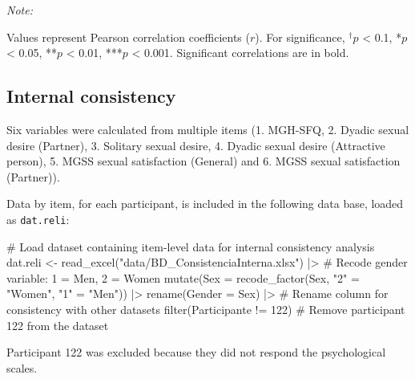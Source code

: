 \documentclass[
  bookmarksnumbered]{article}
\newenvironment{Shaded}{\begin{snugshade}}{\end{snugshade}}
\newcommand{\AttributeTok}[1]{\textcolor[rgb]{0.80,0.80,0.80}{#1}}
\newcommand{\CommentTok}[1]{\textcolor[rgb]{0.50,0.62,0.50}{#1}}
\newcommand{\DecValTok}[1]{\textcolor[rgb]{0.86,0.86,0.80}{#1}}
\newcommand{\FunctionTok}[1]{\textcolor[rgb]{0.94,0.94,0.56}{#1}}
\newcommand{\NormalTok}[1]{\textcolor[rgb]{0.80,0.80,0.80}{#1}}
\newcommand{\OtherTok}[1]{\textcolor[rgb]{0.94,0.94,0.56}{#1}}
\newcommand{\SpecialCharTok}[1]{\textcolor[rgb]{0.86,0.64,0.64}{#1}}
\newcommand{\StringTok}[1]{\textcolor[rgb]{0.80,0.58,0.58}{#1}}
\begin{document}
\begin{landscape}
\begin{table}[H]
{\begin{threeparttable}
\begin{tabular}[t]
\bottomrule
\end{tabular}
\begin{tablenotes}[para]
\item \textit{Note: } 
\item Values represent Pearson correlation coefficients ($r$). For significance, $^{\dagger}p$ < 0.1, *$p$ < 0.05, **$p$ < 0.01, ***$p$ < 0.001. Significant correlations are in bold.
\end{tablenotes}
\end{threeparttable}}
\end{table}
\end{landscape}

\subsection{Internal consistency}\label{internal-consistency}

Six variables were calculated from multiple items (1. MGH-SFQ, 2. Dyadic sexual desire (Partner), 3. Solitary sexual desire, 4. Dyadic sexual desire (Attractive person), 5. MGSS sexual satisfaction (General) and 6. MGSS sexual satisfaction (Partner)).

Data by item, for each participant, is included in the following data base, loaded as \texttt{dat.reli}:

\begin{Shaded}
\begin{Highlighting}[]
\CommentTok{\# Load dataset containing item{-}level data for internal consistency analysis}
\NormalTok{dat.reli }\OtherTok{\textless{}{-}} \FunctionTok{read\_excel}\NormalTok{(}\StringTok{"data/BD\_ConsistenciaInterna.xlsx"}\NormalTok{) }\SpecialCharTok{|\textgreater{}}
  \CommentTok{\# Recode gender variable: 1 = Men, 2 = Women}
  \FunctionTok{mutate}\NormalTok{(}\AttributeTok{Sex =} \FunctionTok{recode\_factor}\NormalTok{(Sex, }\StringTok{"2"} \OtherTok{=} \StringTok{"Women"}\NormalTok{, }\StringTok{"1"} \OtherTok{=} \StringTok{"Men"}\NormalTok{)) }\SpecialCharTok{|\textgreater{}}
  \FunctionTok{rename}\NormalTok{(}\AttributeTok{Gender =}\NormalTok{ Sex) }\SpecialCharTok{|\textgreater{}} \CommentTok{\# Rename column for consistency with other datasets}
  \FunctionTok{filter}\NormalTok{(Participante }\SpecialCharTok{!=} \DecValTok{122}\NormalTok{) }\CommentTok{\# Remove participant 122 from the dataset}
\end{Highlighting}
\end{Shaded}

Participant 122 was excluded because they did not respond the psychological scales.
\end{document}
